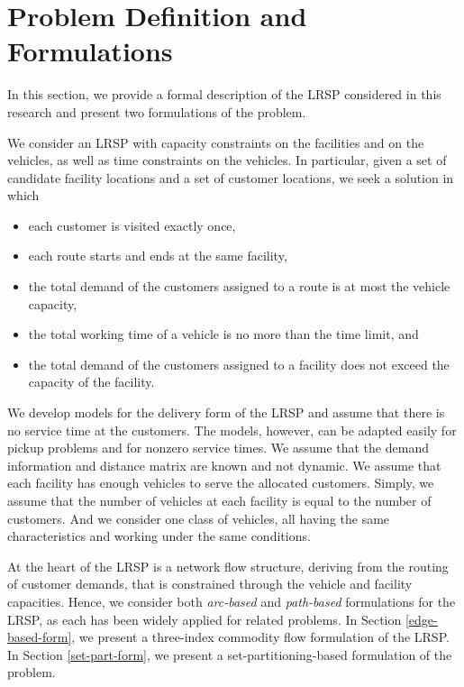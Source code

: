 

\section{Problem Definition and Formulations}
\label{problem}

In this section, we provide a formal description of the LRSP 
considered in this research and present two formulations
of the problem.  

We consider an LRSP with capacity constraints on the facilities and 
on the vehicles, as well as time constraints on the vehicles.
In particular, given a set of candidate facility locations and a set of
customer locations, we seek a solution in which 
\begin{itemize}
\item[i.] each customer is visited exactly once, 
\item [ii.] each route starts and ends at the same facility, 
\item [iii.] the total demand of the customers assigned to a route is at 
most the vehicle capacity, 
\item [iv.] the total working time of a vehicle is no more than the  
time limit, and 
\item [v.] the total demand of the customers assigned to a facility 
does not exceed the capacity of the facility. 
\end{itemize}

We develop models for the delivery form of the LRSP and assume that there is no
service time at the customers.  The models, however, can be adapted easily for 
pickup problems and for nonzero service times. We assume that the demand 
information and distance matrix are known and not dynamic. 
We assume that each facility has enough vehicles to serve the allocated customers.
Simply, we assume that the number of vehicles at each facility is equal to the 
number of customers. And we consider one class of vehicles, all having the same 
characteristics and working under the same conditions. 

At the heart of the LRSP is a network flow structure, deriving from the routing 
of customer demands, that is constrained through the vehicle and facility 
capacities.  Hence, we consider both {\em arc-based} and {\em path-based} formulations 
for the LRSP, as each has been widely applied for related problems.
In Section \ref{edge-based-form}, we present a three-index commodity flow 
formulation of the LRSP. In Section \ref{set-part-form}, we present a 
set-partitioning-based formulation of the problem.  

